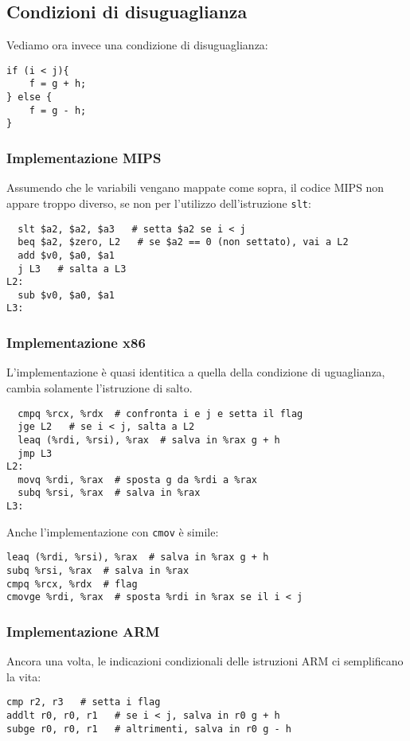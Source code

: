 \documentclass[class=book, crop=false, oneside]{standalone}
\begin{document}
\subsection*{Condizioni di disuguaglianza}
Vediamo ora invece una condizione di disuguaglianza:
\begin{verbatim}
if (i < j){
	f = g + h;
} else {
	f = g - h;
}
\end{verbatim}
\subsubsection*{Implementazione MIPS}
Assumendo che le variabili vengano mappate come sopra, il codice MIPS non appare troppo diverso, se non per l'utilizzo dell'istruzione \texttt{slt}:
\begin{verbatim}
  slt $a2, $a2, $a3   # setta $a2 se i < j
  beq $a2, $zero, L2   # se $a2 == 0 (non settato), vai a L2
  add $v0, $a0, $a1
  j L3   # salta a L3
L2:
  sub $v0, $a0, $a1
L3:
\end{verbatim}
\subsubsection*{Implementazione x86}
L'implementazione è quasi identitica a quella della condizione di uguaglianza, cambia solamente l'istruzione di salto.
\begin{verbatim}
  cmpq %rcx, %rdx  # confronta i e j e setta il flag
  jge L2   # se i < j, salta a L2
  leaq (%rdi, %rsi), %rax  # salva in %rax g + h
  jmp L3
L2:
  movq %rdi, %rax  # sposta g da %rdi a %rax
  subq %rsi, %rax  # salva in %rax
L3:
\end{verbatim}
Anche l'implementazione con \texttt{cmov} è simile:
\begin{verbatim}
leaq (%rdi, %rsi), %rax  # salva in %rax g + h
subq %rsi, %rax  # salva in %rax
cmpq %rcx, %rdx  # flag
cmovge %rdi, %rax  # sposta %rdi in %rax se il i < j
\end{verbatim}

\subsubsection*{Implementazione ARM}
Ancora una volta, le indicazioni condizionali delle istruzioni ARM ci semplificano la vita:
\begin{verbatim}
cmp r2, r3   # setta i flag
addlt r0, r0, r1   # se i < j, salva in r0 g + h
subge r0, r0, r1   # altrimenti, salva in r0 g - h
\end{verbatim}
\end{document}
